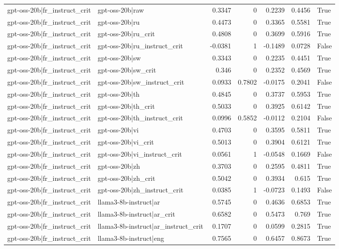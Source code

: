 \begin{table}
\begin{tabular}{l l r r r r l}
gpt-oss-20b|fr_instruct_crit & gpt-oss-20b|raw & 0.3347 & 0 & 0.2239 & 0.4456 & True \\
gpt-oss-20b|fr_instruct_crit & gpt-oss-20b|ru & 0.4473 & 0 & 0.3365 & 0.5581 & True \\
gpt-oss-20b|fr_instruct_crit & gpt-oss-20b|ru_crit & 0.4808 & 0 & 0.3699 & 0.5916 & True \\
gpt-oss-20b|fr_instruct_crit & gpt-oss-20b|ru_instruct_crit & -0.0381 & 1 & -0.1489 & 0.0728 & False \\
gpt-oss-20b|fr_instruct_crit & gpt-oss-20b|sw & 0.3343 & 0 & 0.2235 & 0.4451 & True \\
gpt-oss-20b|fr_instruct_crit & gpt-oss-20b|sw_crit & 0.346 & 0 & 0.2352 & 0.4569 & True \\
gpt-oss-20b|fr_instruct_crit & gpt-oss-20b|sw_instruct_crit & 0.0933 & 0.7802 & -0.0175 & 0.2041 & False \\
gpt-oss-20b|fr_instruct_crit & gpt-oss-20b|th & 0.4845 & 0 & 0.3737 & 0.5953 & True \\
gpt-oss-20b|fr_instruct_crit & gpt-oss-20b|th_crit & 0.5033 & 0 & 0.3925 & 0.6142 & True \\
gpt-oss-20b|fr_instruct_crit & gpt-oss-20b|th_instruct_crit & 0.0996 & 0.5852 & -0.0112 & 0.2104 & False \\
gpt-oss-20b|fr_instruct_crit & gpt-oss-20b|vi & 0.4703 & 0 & 0.3595 & 0.5811 & True \\
gpt-oss-20b|fr_instruct_crit & gpt-oss-20b|vi_crit & 0.5013 & 0 & 0.3904 & 0.6121 & True \\
gpt-oss-20b|fr_instruct_crit & gpt-oss-20b|vi_instruct_crit & 0.0561 & 1 & -0.0548 & 0.1669 & False \\
gpt-oss-20b|fr_instruct_crit & gpt-oss-20b|zh & 0.3703 & 0 & 0.2595 & 0.4811 & True \\
gpt-oss-20b|fr_instruct_crit & gpt-oss-20b|zh_crit & 0.5042 & 0 & 0.3934 & 0.615 & True \\
gpt-oss-20b|fr_instruct_crit & gpt-oss-20b|zh_instruct_crit & 0.0385 & 1 & -0.0723 & 0.1493 & False \\
gpt-oss-20b|fr_instruct_crit & llama3-8b-instruct|ar & 0.5745 & 0 & 0.4636 & 0.6853 & True \\
gpt-oss-20b|fr_instruct_crit & llama3-8b-instruct|ar_crit & 0.6582 & 0 & 0.5473 & 0.769 & True \\
gpt-oss-20b|fr_instruct_crit & llama3-8b-instruct|ar_instruct_crit & 0.1707 & 0 & 0.0599 & 0.2815 & True \\
gpt-oss-20b|fr_instruct_crit & llama3-8b-instruct|eng & 0.7565 & 0 & 0.6457 & 0.8673 & True \\

\end{tabular}
\end{table}
